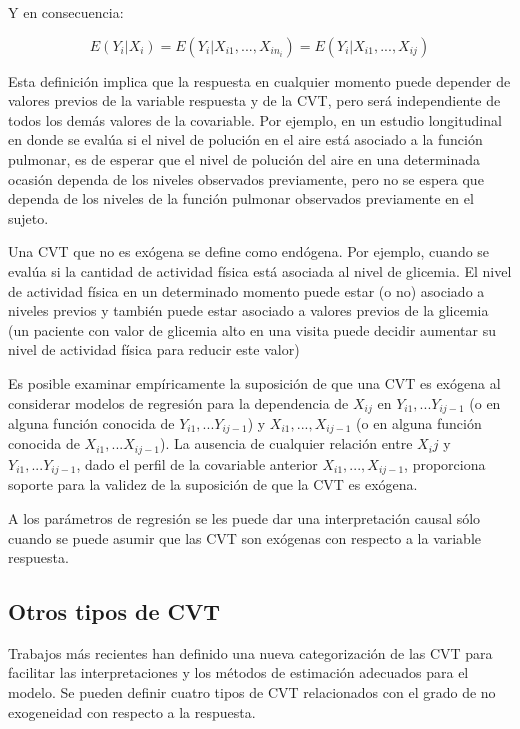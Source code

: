 \documentclass[spanish]{article}
\numberwithin{figure}{subsection}
\numberwithin{equation}{subsection}
\numberwithin{table}{subsection}
\begin{document}
Y en consecuencia:

\begin{equation}
	\label{exogeneidad debil}
	E(Y_i|X_i) = E(Y_i|X_{i1}, ..., X_{in_i}) = E(Y_i|X_{i1}, ..., X_{ij})
\end{equation}

Esta definición implica que la respuesta en cualquier momento puede depender de valores previos de la variable respuesta
y de la CVT, pero será independiente de todos los demás valores de la covariable. Por ejemplo, en un estudio longitudinal
en donde se evalúa si el nivel de polución en el aire está asociado a la función pulmonar, es de esperar que el nivel de
polución del aire en una determinada ocasión dependa de los niveles observados previamente, pero no se espera que dependa
de los niveles de la función pulmonar observados previamente en el sujeto.

Una CVT que no es exógena se define como endógena. Por ejemplo, cuando se evalúa si la cantidad de actividad física
está asociada al nivel de glicemia. El nivel de actividad física en un determinado momento puede estar (o no) asociado
a niveles previos y también puede estar asociado a valores previos de la glicemia (un paciente con valor de glicemia
alto en una visita puede decidir aumentar su nivel de actividad física para reducir este valor)

Es posible examinar empíricamente la suposición de que una CVT es exógena al considerar modelos de regresión para la
dependencia de $X_{ij}$ en $Y_{i1}, ... Y_{ij-1}$ (o en alguna función conocida de $Y_{i1}, ... Y_{ij-1}$) y
$X_{i1}, ..., X_{ij-1}$	(o en alguna función conocida de $X_{i1}, ... X_{ij-1}$). La ausencia de cualquier relación
entre $X_ij$ y $Y_{i1}, ... Y_{ij-1}$, dado el perfil de la covariable anterior $X_{i1}, ..., X_{ij-1}$, proporciona
soporte para la validez de la suposición de que la CVT es exógena.

A los parámetros de regresión se les puede dar una interpretación causal sólo cuando se puede asumir que las CVT son
exógenas con respecto a la variable respuesta.

\subsection{Otros tipos de CVT}

Trabajos más recientes han definido una nueva categorización de las CVT para facilitar las interpretaciones y los
métodos de estimación adecuados para el modelo. Se pueden definir cuatro tipos de CVT relacionados con el grado de
no exogeneidad con respecto a la respuesta.
\end{document}
